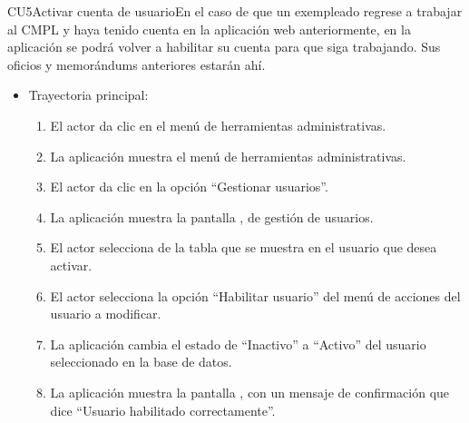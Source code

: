\newpage
\begin{UseCase}{CU5}{Activar cuenta de usuario}{En el caso de que un exempleado regrese a trabajar al CMPL y haya tenido cuenta en la aplicación web anteriormente, en la aplicación se podrá volver a habilitar su cuenta para que siga trabajando. Sus oficios y memorándums anteriores estarán ahí.}
	\end{UseCase}
	
			\begin{itemize}
				\item Trayectoria principal:
					\begin{enumerate}
						\item El actor da clic en el menú de herramientas administrativas.
						\item La aplicación muestra el menú de herramientas administrativas.
						\item El actor da clic en la opción ``Gestionar usuarios''.
						\item La aplicación muestra la pantalla , de gestión de usuarios.
						\item El actor selecciona de la tabla que se muestra en  el usuario que desea activar.
						\item El actor selecciona la opción ``Habilitar usuario'' del menú de acciones del usuario a modificar.
						\item La aplicación cambia el estado de ``Inactivo'' a ``Activo'' del usuario seleccionado en la base de datos.
						\item La aplicación muestra la pantalla , con un mensaje de confirmación que dice ``Usuario habilitado correctamente''.
					\end{enumerate}
			\end{itemize}
			
